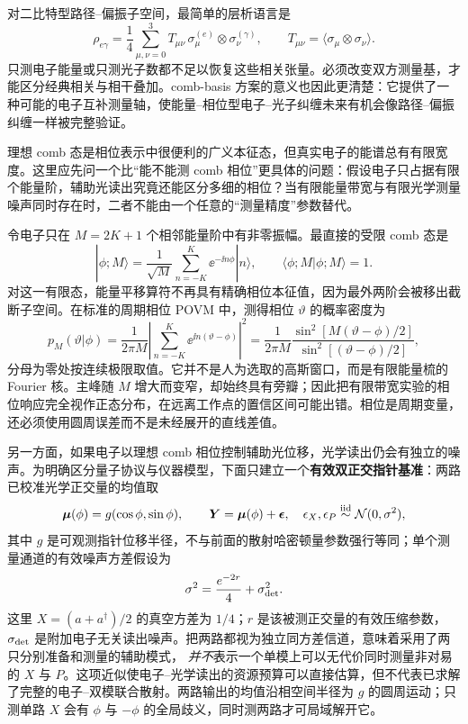 对二比特型路径--偏振子空间，最简单的层析语言是
\begin{equation}
\rho_{e\gamma}=\frac14\sum_{\mu,\nu=0}^{3}
T_{\mu\nu}\,\sigma_\mu^{(e)}\otimes\sigma_\nu^{(\gamma)},
\qquad
T_{\mu\nu}=\langle\sigma_\mu\otimes\sigma_\nu\rangle.
\label{eq:ch04-twoqubit-tomo}
\end{equation}
只测电子能量或只测光子数都不足以恢复这些相关张量。必须改变双方测量基，才能区分经典相关与相干叠加。comb-basis 方案的意义也因此更清楚：它提供了一种可能的电子互补测量轴，使能量--相位型电子--光子纠缠未来有机会像路径--偏振纠缠一样被完整验证。


理想 comb 态是相位表示中很便利的广义本征态，但真实电子的能谱总有有限宽度。这里应先问一个比“能不能测 comb 相位”更具体的问题：假设电子只占据有限个能量阶，辅助光读出究竟还能区分多细的相位？当有限能量带宽与有限光学测量噪声同时存在时，二者不能由一个任意的“测量精度”参数替代。

令电子只在 $M=2K+1$ 个相邻能量阶中有非零振幅。最直接的受限 comb 态是
\begin{equation}
|\phi;M\rangle=\frac{1}{\sqrt M}\sum_{n=-K}^{K}\ee^{-\ii n\phi}|n\rangle,
\qquad \langle\phi;M|\phi;M\rangle=1.
\label{eq:ch04-finite-comb}
\end{equation}
对这一有限态，能量平移算符不再具有精确相位本征值，因为最外两阶会被移出截断子空间。在标准的周期相位 POVM 中，测得相位 $\vartheta$ 的概率密度为
\begin{equation}
p_M(\vartheta|\phi)=\frac{1}{2\pi M}
\left|\sum_{n=-K}^K \ee^{\ii n(\vartheta-\phi)}\right|^2
=\frac{1}{2\pi M}\frac{\sin^2[M(\vartheta-\phi)/2]}{\sin^2[(\vartheta-\phi)/2]},
\label{eq:ch04-fejer}
\end{equation}
分母为零处按连续极限取值。它并不是人为选取的高斯窗口，而是有限能量梳的 Fourier 核。主峰随 $M$ 增大而变窄，却始终具有旁瓣；因此把有限带宽实验的相位响应完全视作正态分布，在远离工作点的置信区间可能出错。相位是周期变量，还必须使用圆周误差而不是未经展开的直线差值。

另一方面，如果电子以理想 comb 相位控制辅助光位移，光学读出仍会有独立的噪声。为明确区分量子协议与仪器模型，下面只建立一个\textbf{有效双正交指针基准}：两路已校准光学正交量的均值取
\begin{equation}
\boldsymbol\mu(\phi)=g(\cos\phi,\sin\phi),\qquad
\boldsymbol Y=\boldsymbol\mu(\phi)+\boldsymbol\epsilon,
\quad\epsilon_X,\epsilon_P\overset{\rm iid}{\sim}{\cal N}(0,\sigma^2),
\label{eq:ch04-pointer}
\end{equation}
其中 $g$ 是可观测指针位移半径，不与前面的散射哈密顿量参数强行等同；单个测量通道的有效噪声方差假设为
\begin{equation}
\sigma^2=\frac{e^{-2r}}4+\sigma_{\rm det}^2.
\label{eq:ch04-pointer-noise}
\end{equation}
这里 $X=(a+a^\dagger)/2$ 的真空方差为 $1/4$；$r$ 是该被测正交量的有效压缩参数，$\sigma_{\rm det}$ 是附加电子无关读出噪声。把两路都视为独立同方差信道，意味着采用了两只分别准备和测量的辅助模式，
\emph{并不}表示一个单模上可以无代价同时测量非对易的 $X$ 与 $P$。这项近似使电子--光学读出的资源预算可以直接估算，但不代表已求解了完整的电子--双模联合散射。两路输出的均值沿相空间半径为 $g$ 的圆周运动；只测单路 $X$ 会有 $\phi$ 与 $-\phi$ 的全局歧义，同时测两路才可局域解开它。

